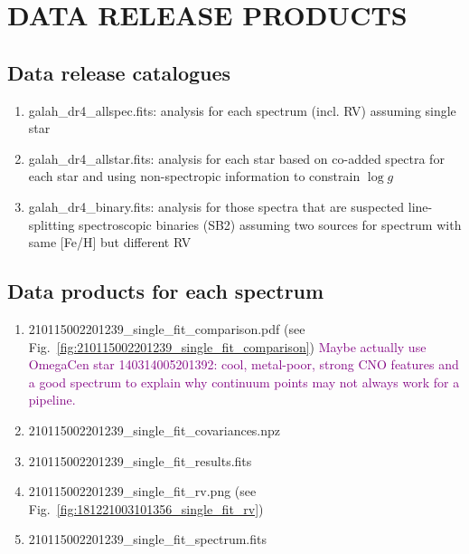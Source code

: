 \documentclass[
  journal=pasa,
  manuscript=research-paper, %
  year=2023,
  volume=37
]{cup-journal}
\newcommand{\SB}[1]{{\textcolor{purple}{#1}}}
\newcommand{\logg}{$\log g$\xspace}
\begin{document}
\section{DATA RELEASE PRODUCTS}
\label{sec:catalogues_release_products}

\subsection{Data release catalogues}
\label{sec:data_release_catalogues}

\begin{enumerate}
   \item galah\_dr4\_allspec.fits: analysis for each spectrum (incl. RV) assuming single star
   \item galah\_dr4\_allstar.fits: analysis for each star based on co-added spectra for each star and using non-spectropic information to constrain \logg
   \item galah\_dr4\_binary.fits: analysis for those spectra that are suspected line-splitting spectroscopic binaries (SB2) assuming two sources for spectrum with same [Fe/H] but different RV
\end{enumerate}

\subsection{Data products for each spectrum}
\label{sec:data_products_for_each_spectrum}

\begin{enumerate}
   \item 210115002201239\_single\_fit\_comparison.pdf (see Fig.~\ref{fig:210115002201239_single_fit_comparison}) \SB{Maybe actually use OmegaCen star 140314005201392: cool, metal-poor, strong CNO features and a good spectrum to explain why continuum points may not always work for a pipeline.}
   \item 210115002201239\_single\_fit\_covariances.npz
   \item 210115002201239\_single\_fit\_results.fits
   \item 210115002201239\_single\_fit\_rv.png (see Fig.~\ref{fig:181221003101356_single_fit_rv})
   \item 210115002201239\_single\_fit\_spectrum.fits
\end{enumerate}
\end{document}
